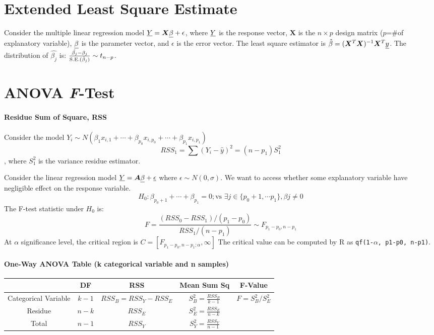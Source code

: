 \section{Extended Least Square Estimate}

Consider the multiple linear regression model $\underline{Y}=\bm{X}\underline{\beta}+\epsilon$, where $\underline{Y}$ is the response vector, $\bm{X}$ is the $n\times p$ design matrix ($p$=\#of explanatory variable), $\underline{\beta}$ is the parameter vector, and $\epsilon$ is the error vector.
The least square estimator is $\hat{\beta}=(\bm{X}^T\bm{X})^{-1}\bm{X}^T\underline{y}$.
The distribution of $\hat{\beta_j}$ is: $\frac{\hat{\beta_j}-\beta_j}{\text{S.E.}(\hat{\beta}_j)} \sim t_{n-p}$. 

\section{ANOVA \textit{F}-Test}
\paragraph{Residue Sum of Square, RSS}
Consider the model $Y_i \sim N(\beta_1x_{i,1}+\cdots+\beta_{p_0}x_{i, p_0}+\cdots+ \beta_{p_1}x_{i, p_1})$
\[RSS_1=\sum (Y_i-\hat{y})^2=(n-p_1)S^2_1\], where $S^2_1$ is the variance residue estimator.
\begin{definition}
	Consider the linear regression model $\underline{Y} = \bm{A} \underline{\beta}+\underline{\epsilon}$ where $\epsilon \sim N(0, \sigma) $. 
	We want to access whether some explanatory variable have negligible effect on the response variable.
	\[H_0: \beta_{p_0+1} + \cdots + \beta_{p_1}=0; \text{vs } \exists j \in \{p_{0}+1, \cdots p_1\}, \beta j \neq 0 \]
	The F-test statistic under $H_0$ is:
	\[F=\frac{(RSS_0-RSS_1)/(p_1-p_0)}{RSS_1/(n-p_1)} \sim F_{p_1-p_0, n-p_1}\]
	At $\alpha$ significance level, the critical region is $C=[F_{p_1-p_0, n-p_1; \alpha}, \infty]$
	The critical value can be computed by R as \texttt{qf(1-$\alpha$, p1-p0, n-p1)}.
\end{definition}

\paragraph{One-Way ANOVA Table (k categorical variable and n samples)}
\begin{table}[ht]
	\centering
	\begin{tabular}{|c|c|c|c|c|}
			 & DF & RSS & Mean Sum Sq & F-Value \\
			\hline
			Categorical Variable & $k-1$ & $RSS_B=RSS_Y-RSS_E$ & $S^2_B=\frac{RSS_B}{k-1}$ & $F=S^2_B/S^2_E$\\
			Residue & $n-k$ & $RSS_E$ & $S_E^2=\frac{RSS_E}{n-k}$ & \\
			Total & $n-1$ & $RSS_Y$ & $S_Y^2=\frac{RSS_Y}{n-1}$& \\
	\end{tabular}
\end{table}

